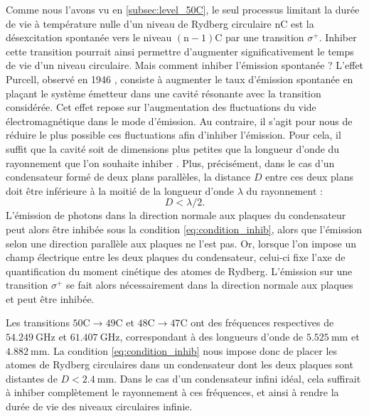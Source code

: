 Comme nous l'avons vu en \ref{subsec:level_50C}, le seul processus limitant la durée de vie à température nulle d'un niveau de Rydberg circulaire $\mathrm{nC}$ est la désexcitation spontanée vers le niveau $\mathrm{(n-1)C}$ par une transition $\sigma^+$.
Inhiber cette transition pourrait ainsi permettre d'augmenter significativement le temps de vie d'un niveau circulaire.
Mais comment inhiber l'émission spontanée ?
L'effet Purcell, observé en 1946 \cite{Purcell46_Purcelleffect}, consiste à augmenter le taux d'émission spontanée en plaçant le système émetteur dans une cavité résonante avec la transition considérée.
Cet effet repose sur l'augmentation des fluctuations du vide électromagnétique dans le mode d'émission.
Au contraire, il s'agit pour nous de réduire le plus possible ces fluctuations afin d'inhiber l'émission.
Pour cela, il suffit que la cavité soit de dimensions plus petites que la longueur d'onde du rayonnement que l'on souhaite inhiber \cite{MX_KELPPNER_INHIBITION,MX_KLEPPNERINHIBITION85}.
Plus, précisément, dans le cas d'un condensateur formé de deux plans parallèles, la distance $D$ entre ces deux plans doit être inférieure à la moitié de la longueur d'onde $\lambda$ du rayonnement :
%
\begin{equation}
\label{eq:condition_inhib}
D< \lambda/2.
\end{equation}
%
L'émission de photons dans la direction normale aux plaques du condensateur peut alors être inhibée sous la condition \eqref{eq:condition_inhib}, alors que l'émission selon une direction parallèle aux plaques ne l'est pas.
Or, lorsque l'on impose un champ électrique entre les deux plaques du condensateur, celui-ci fixe l'axe de quantification du moment cinétique des atomes de Rydberg.
L'émission sur une transition $\sigma^+$ se fait alors nécessairement dans la direction normale aux plaques et peut être inhibée.

Les transitions $\mathrm{50C}\!\rightarrow \!\mathrm{49C}$ et $\mathrm{48C}\!\rightarrow\! \mathrm{47C}$ ont des fréquences respectives de $\SI{54.249}{\GHz}$ et $\SI{61.407}{\GHz}$, correspondant à des longueurs d'onde de $\SI{5.525}{\mm}$ et $\SI{4.882}{\mm}$.
La condition \eqref{eq:condition_inhib} nous impose donc de placer les atomes de Rydberg circulaires dans un condensateur dont les deux plaques sont distantes de $D<\SI{2.4}{\mm}$.
Dans le cas d'un condensateur infini idéal, cela suffirait à inhiber complètement le rayonnement à ces fréquences, et ainsi à rendre la durée de vie des niveaux circulaires infinie.


